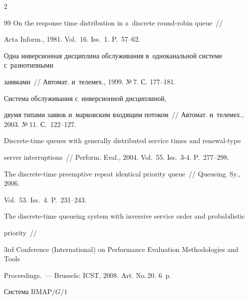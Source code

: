 \begin{multicols}{2}
{{\begin{thebibliography}{99}
 On the response time distribution in a~discrete round-robin queue~//

Acta Inform., 1981. Vol.~16. Iss.~1. P.~57--62.





Одна инверсионная дисциплина обслуживания в~одноканальной системе с~разнотипными

 заявками~// Автомат. и~телемех., 1999. №\,7. С. 177--181.




 Система обслуживания с~инверсионной дисциплиной, 

двумя типами заявок и~марковским входящим потоком~//  Автомат. и~телемех., 2003. №\,11. С.~122--127.







Discrete-time queues with generally distributed service times and renewal-type 

server interruptions~// Perform. Eval., 2004. Vol.~55. Iss.~\mbox{3-4}. P.~277--298.







The discrete-time preemptive repeat identical priority queue~// Queueing~Sy., 2006. 

Vol.~53. Iss.~4. P.~231--243.





The discrete-time queueing system with inversive service order and probabilistic

 priority~//

3rd Conference (International) on Performance Evaluation Methodologies and Tools 

 Proceedings.~--- Brussels: ICST, 2008. Art. No.\,20. 6~p.






 Система ${\mathrm{BMAP}/G/1}$ 


\end{thebibliography}}}
\end{multicols}
